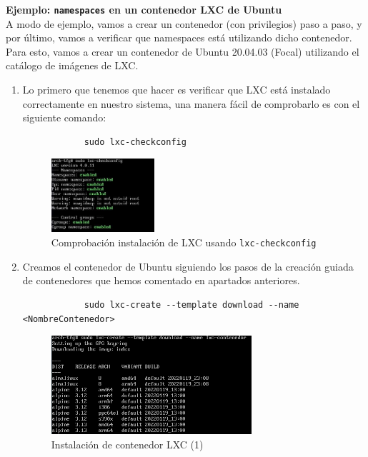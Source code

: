 \documentclass[12pt]{article}
\begin{document}
	\pagebreak
	
	\noindent \textbf{\large Ejemplo: \texttt{namespaces} en un contenedor LXC de Ubuntu}\\
	
	\noindent A modo de ejemplo, vamos a crear un contenedor (con privilegios) paso a paso, y por último, vamos a verificar que namespaces está utilizando dicho contenedor. Para esto, vamos a crear un contenedor de Ubuntu 20.04.03 (Focal) utilizando el catálogo de imágenes de LXC.
	
	\begin{enumerate}
		\item Lo primero que tenemos que hacer es verificar que LXC está instalado correctamente en nuestro sistema, una manera fácil de comprobarlo es con el siguiente comando:
		\begin{verbatim}
			sudo lxc-checkconfig
		\end{verbatim}
	
		\begin{figure}[h!]
			\begin{center}
				\includegraphics[width=0.36\textwidth]{img/lxc_ns1.jpg}
				\caption{Comprobación instalación de LXC usando \texttt{lxc-checkconfig}}
			\end{center}
		\end{figure}
	
		\item Creamos el contenedor de Ubuntu siguiendo los pasos de la creación guiada de contenedores que hemos comentado en apartados anteriores.
		\begin{verbatim}
			sudo lxc-create --template download --name <NombreContenedor>
		\end{verbatim}
		
		\begin{figure}[h!]
			\begin{center}
				\includegraphics[width=0.7\textwidth]{img/lxc_ns2.png}
				\caption{Instalación de contenedor LXC (1)}
			\end{center}
		\end{figure}
		

\end{enumerate}
\end{document}
